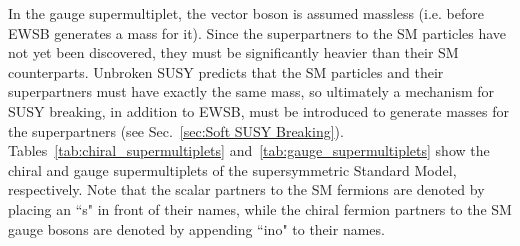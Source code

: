 \documentclass[dissertation.tex]{subfiles}
\begin{document}
In the gauge supermultiplet, the vector boson is assumed massless (i.e. before EWSB generates a mass for it).  Since the superpartners to the SM particles have not yet been discovered, they must be significantly heavier than their SM counterparts.  Unbroken SUSY predicts that the SM particles and their superpartners must have exactly the same mass, so ultimately a mechanism for SUSY breaking, in addition to EWSB, must be introduced to generate masses for the superpartners (see Sec.~\ref{sec:Soft SUSY Breaking}).  Tables~\ref{tab:chiral_supermultiplets} and~\ref{tab:gauge_supermultiplets} show the chiral and gauge supermultiplets of the supersymmetric Standard Model, respectively.  Note that the scalar partners to the SM fermions are denoted by placing an ``s" in front of their names, while the chiral fermion partners to the SM gauge bosons are denoted by appending ``ino" to their names.
\end{document}

